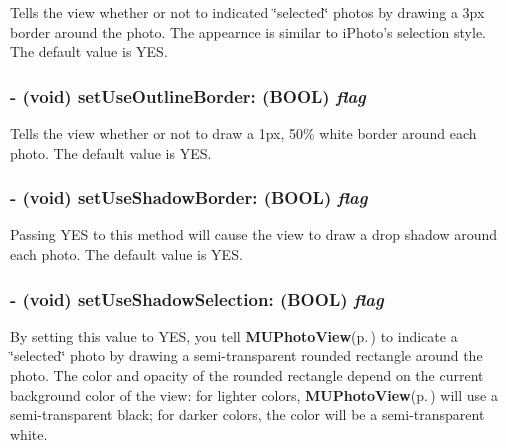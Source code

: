 Tells the view whether or not to indicated \char`\"{}selected\char`\"{} photos by drawing a 3px border around the photo. The appearnce is similar to i\-Photo's selection style. The default value is YES. 
\subsubsection{\setlength{\rightskip}{0pt plus 5cm}- (void) set\-Use\-Outline\-Border: (BOOL) {\em flag}}\label{interface_m_u_photo_view_5e9fab8f2f9694656bcf206f320e58d4}


Tells the view whether or not to draw a 1px, 50\% white border around each photo. The default value is YES. 
\subsubsection{\setlength{\rightskip}{0pt plus 5cm}- (void) set\-Use\-Shadow\-Border: (BOOL) {\em flag}}\label{interface_m_u_photo_view_9547dbd8c247d3f976a14b60075e7052}


Passing YES to this method will cause the view to draw a drop shadow around each photo. The default value is YES. 
\subsubsection{\setlength{\rightskip}{0pt plus 5cm}- (void) set\-Use\-Shadow\-Selection: (BOOL) {\em flag}}\label{interface_m_u_photo_view_336789ce4ddaeb4078ad829f274cfff5}


By setting this value to YES, you tell {\bf MUPhoto\-View}{\rm (p.\,\pageref{interface_m_u_photo_view})} to indicate a \char`\"{}selected\char`\"{} photo by drawing a semi-transparent rounded rectangle around the photo. The color and opacity of the rounded rectangle depend on the current background color of the view: for lighter colors, {\bf MUPhoto\-View}{\rm (p.\,\pageref{interface_m_u_photo_view})} will use a semi-transparent black; for darker colors, the color will be a semi-transparent white. 
